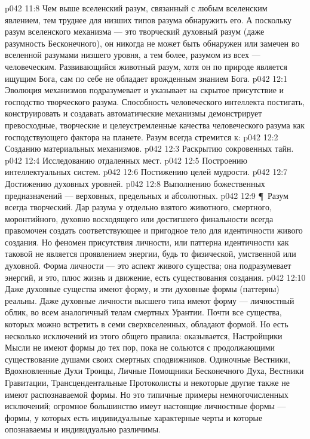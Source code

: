 \vs p042 11:8 Чем выше вселенский разум, связанный с любым вселенским явлением, тем труднее для низших типов разума обнаружить его. А поскольку разум вселенского механизма --- это творческий духовный разум (даже разумность Бесконечного), он никогда не может быть обнаружен или замечен во вселенной разумами низшего уровня, а тем более,  разумом из всех --- человеческим. Развивающийся животный разум, хотя он по природе является ищущим Бога, сам по себе не обладает врожденным знанием Бога.
\vs p042 12:1 Эволюция механизмов подразумевает и указывает на скрытое присутствие и господство творческого разума. Способность человеческого интеллекта постигать, конструировать и создавать автоматические механизмы демонстрирует превосходные, творческие и целеустремленные качества человеческого разума как господствующего фактора на планете. Разум всегда стремится к:
\vs p042 12:2 \bibnobreakspace Созданию материальных механизмов.
\vs p042 12:3 \bibnobreakspace Раскрытию сокровенных тайн.
\vs p042 12:4 \bibnobreakspace Исследованию отдаленных мест.
\vs p042 12:5 \bibnobreakspace Построению интеллектуальных систем.
\vs p042 12:6 \bibnobreakspace Постижению целей мудрости.
\vs p042 12:7 \bibnobreakspace Достижению духовных уровней.
\vs p042 12:8 \bibnobreakspace Выполнению божественных предназначений --- верховных, предельных и абсолютных.
\vs p042 12:9 \P\ Разум всегда творческий. Дар разума у отдельно взятого животного, смертного, моронтийного, духовно восходящего или достигшего финальности всегда правомочен создать соответствующее и пригодное тело для идентичности живого создания. Но феномен присутствия личности, или паттерна идентичности как таковой не является проявлением энергии, будь то физической, умственной или духовной. Форма личности --- это  аспект живого существа; она подразумевает  энергий, и это, плюс жизнь и движение, есть  существования создания.
\vs p042 12:10 Даже духовные существа имеют форму, и эти духовные формы (паттерны) реальны. Даже духовные личности высшего типа имеют форму --- личностный облик, во всем аналогичный телам смертных Урантии. Почти все существа, которых можно встретить в семи сверхвселенных, обладают формой. Но есть несколько исключений из этого общего правила: оказывается, Настройщики Мысли не имеют формы до тех пор, пока не сольются с продолжающими существование душами своих смертных сподвижников. Одиночные Вестники, Вдохновленные Духи Троицы, Личные Помощники Бесконечного Духа, Вестники Гравитации, Трансцендентальные Протоколисты и некоторые другие также не имеют распознаваемой формы. Но это типичные примеры немногочисленных исключений; огромное большинство имеут настоящие личностные формы --- формы, у которых есть индивидуальные характерные черты и которые опознаваемы и индивидуально различимы.
